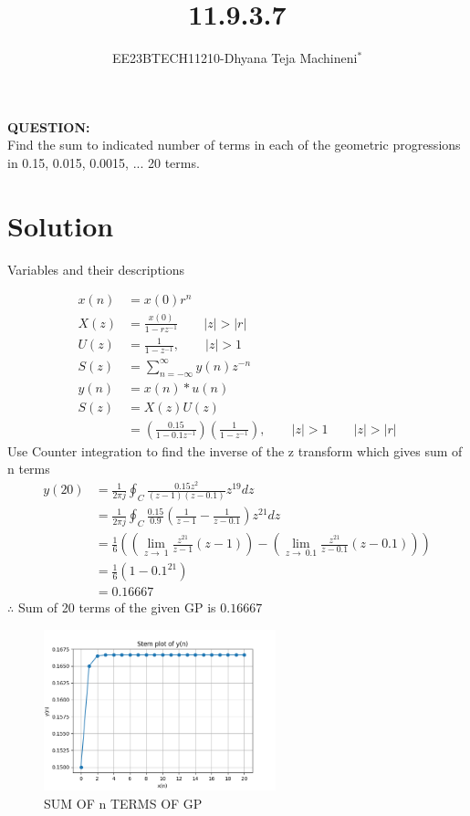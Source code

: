 \documentclass[journal,12pt,twocolumn]{IEEEtran}
\theoremstyle{remark}
\begin{document}

\vspace{3cm}
\title{\textbf{11.9.3.7}}
\author{EE23BTECH11210-Dhyana Teja Machineni$^{*}$%
}
\maketitle
\newpage
\bigskip

\textbf{QUESTION:}\\
Find the sum to indicated number of terms in each of the geometric progressions in
0.15, 0.015, 0.0015, ... 20 terms.
\section*{Solution}
 
\begin{flushleft}
     \begin{table}[h]
         \caption{Variables and their descriptions}
         \label{tab:table2}
         
     \end{table}
 \end{flushleft}
\begin{align}
x(n) &= x(0)r^n \\
X(z) &= \frac{x(0)}{1-rz^{-1}} \qquad |z| > |r| \\
U(z)&=\frac{1}{1-z^{-1}}, \qquad |z|>1\\
S(z)&=\sum_{n=-\infty}^{\infty}y(n) z^{-n}\\
y(n)&= x(n)*u(n)\\
S(z)&=X(z)U(z)\\
&= \left( \frac{0.15}{1-0.1z^{-1}}\right)\left(\frac{1}{1-z^{-1}} \right),\qquad |z| > 1  \qquad |z|>|r|
\end{align}
Use Counter integration to find the inverse of the z transform which gives sum of n terms
\begin{align}
y(20)&=\frac{1}{2\pi j}\oint_C \frac{0.15 z^2}{(z-1)(z-0.1)}z^{19} dz\\
&=\frac{1}{2 \pi j}\oint_C \frac{0.15}{0.9} \left(\frac{1}{z-1} - \frac{1}{z-0.1} \right)z^{21}dz\\
&= \frac{1}{6} \left(\left(\lim_{z\to \ 1}\frac{z^{21}}{z-1} (z-1) \right)-\left(\lim_{z \to \ 0.1}\frac{z^{21}}{z-0.1} (z-0.1)\right)\right)\\
&= \frac{1}{6}(1- 0.1^{21})\\
    &=0.16667
\end{align}
        $\therefore$ Sum of 20 terms of the given GP is $0.16667$
       \renewcommand{\thefigure}{\theenumi}
 \renewcommand{\thetable}{\theenumi}
\begin{figure}[h]
  \centering
  \includegraphics[width=0.6\textwidth]{figs/graph.png}
  \caption{SUM OF n TERMS OF GP}
  \label{fig:your_label}
\end{figure}
\end{document}
